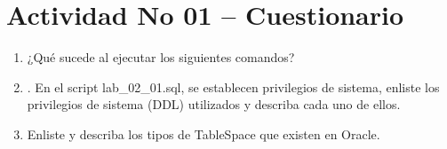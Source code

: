 \section{Actividad No 01 – Cuestionario} 

\begin{enumerate}[1.]
	\item ¿Qué sucede al ejecutar los siguientes comandos?

	\item . En el script lab\_02\_01.sql, se establecen privilegios de sistema, enliste los privilegios de sistema (DDL) utilizados y describa cada uno de ellos.
	
	\item Enliste y describa los tipos de TableSpace que existen en Oracle.
	
	

\end{enumerate} 
